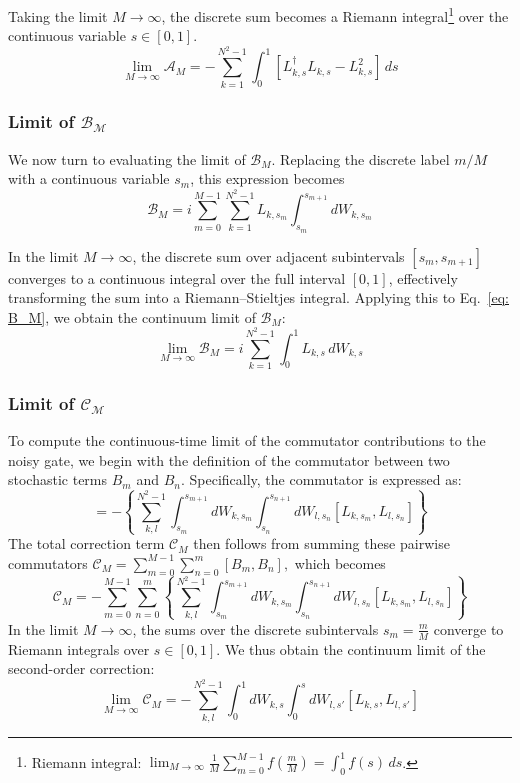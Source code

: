 \documentclass[9pt,a4paper,twocolumn,twoside]{tau-class/tau}
\begin{document}
Taking the limit $M \to \infty$, the discrete sum becomes a Riemann integral\footnote{Riemann integral: 
\( \lim_{M \to \infty} \frac{1}{M} \sum_{m=0}^{M-1} f\left( \frac{m}{M} \right) = \int_0^1 f(s)\, ds \).} over the continuous variable $s \in [0,1]$.
\begin{equation}
    \lim_{M \to \infty} \mathcal{A}_M = - \sum_{k=1}^{N^2 - 1} \int_0^1 \left[ L_{k,s}^\dagger L_{k,s} - L_{k,s}^2 \right] \, ds
\end{equation}

\subsubsection*{Limit of $\mathcal{B_M}$}
We now turn to evaluating the limit of $\mathcal{B}_M$. Replacing the discrete label $m/M$ with a continuous variable $s_m$, this expression becomes
\begin{equation}
  \mathcal{B}_M = i \sum_{m=0}^{M-1} \sum_{k=1}^{N^2 - 1} L_{k, s_m} \int_{s_m}^{s_{m+1}} dW_{k,s_m}  
  \label{eq: B_M}
\end{equation}

In the limit \( M \to \infty \), the discrete sum over adjacent subintervals \( [s_m, s_{m+1}] \) converges to a continuous integral over the full interval \( [0,1] \), effectively transforming the sum into a Riemann–Stieltjes integral. Applying this to Eq.~\eqref{eq: B_M}, we obtain the continuum limit of \( \mathcal{B}_M \):
\begin{equation}
    \lim_{M \to \infty} \mathcal{B}_M = i \sum_{k=1}^{N^2 - 1} \int_0^1 L_{k,s} \, dW_{k,s}
\end{equation}


\subsubsection*{Limit of $\mathcal{C_M}$}
To compute the continuous-time limit of the commutator contributions to the noisy gate, we begin with the definition of the commutator between two stochastic terms $B_m$ and $B_n$. Specifically, the commutator is expressed as:
\begin{equation}
    [B_m, B_n] = - \left\{ \sum_{k,l}^{N^2 - 1} \int_{s_m}^{s_{m+1}} dW_{k,s_m} \int_{s_n}^{s_{n+1}} dW_{l, s_n} [L_{k, s_m}, L_{l, s_n}] \right\}
\end{equation}
The total correction term $\mathcal{C}_M$ then follows from summing these pairwise commutators
$
\mathcal{C}_M = \sum_{m=0}^{M-1} \sum_{n=0}^{m} [B_m, B_n],
$
which becomes
\begin{equation}
    \mathcal{C}_M = - \sum_{m=0}^{M-1} \sum_{n=0}^{m}\left\{ \sum_{k,l}^{N^2 - 1} \int_{s_m}^{s_{m+1}} dW_{k,s_m} \int_{s_n}^{s_{n+1}} dW_{l, s_n} [L_{k, s_m}, L_{l, s_n}] \right\}
\end{equation}
In the limit $M \to \infty$, the sums over the discrete subintervals $s_m = \frac{m}{M}$ converge to Riemann integrals over $s \in [0,1]$. We thus obtain the continuum limit of the second-order correction:
\begin{equation}
    \lim_{M \to \infty} \mathcal{C}_M = - \sum_{k,l}^{N^2-1} \int_0^1 dW_{k,s} \int_0^s dW_{l,s'} [L_{k,s}, L_{l,s'}]
\end{equation}
\end{document}
